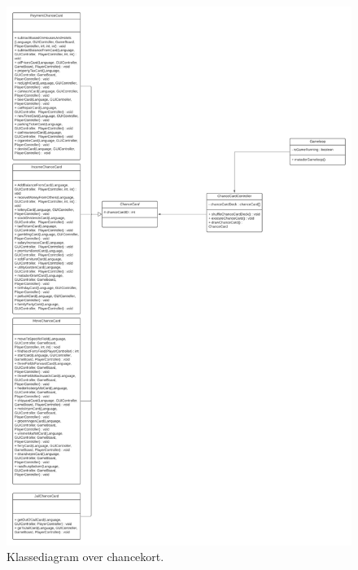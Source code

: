 \begin{flushleft}
\begin{figure}[H]
    \centering
    \includegraphics[width=14cm]{Report/figures/Klassediagram/ChanceCard_klassediagram.png}
    \caption{Klassediagram over chancekort.}
    \label{Klasse_chancekort}
\end{figure}



\end{flushleft}
